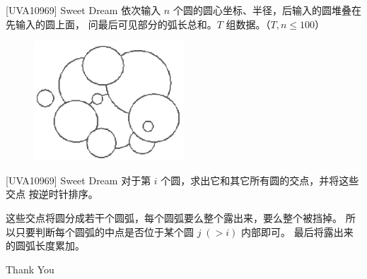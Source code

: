 \documentclass{beamer}
\begin{document}
\begin{frame}{[UVA10969] Sweet Dream}
    \small
    依次输入 $n$ 个圆的圆心坐标、半径，后输入的圆堆叠在先输入的圆上面，
    问最后可见部分的弧长总和。$T$ 组数据。（$T,n\leq 100$）

    \begin{figure}[H]
        \centering
        \includegraphics[width=0.5\textwidth]{pic/sweetdream.png}
    \end{figure}
\end{frame}

\begin{frame}{[UVA10969] Sweet Dream}
    \small
    对于第 $i$ 个圆，求出它和其它所有圆的交点，并将这些交点
    按逆时针排序。

    \vspace{1em}\pause
    这些交点将圆分成若干个圆弧，每个圆弧要么整个露出来，要么整个被挡掉。
    所以只要判断每个圆弧的中点是否位于某个圆 $j\;(>i)$ 内部即可。
    最后将露出来的圆弧长度累加。
\end{frame}

\begin{frame}
    \begin{center}
        {\Huge\calligra Thank You}
    \end{center}
\end{frame}
\end{document}
